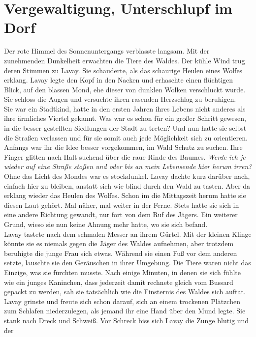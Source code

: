 \chapter{Vergewaltigung, Unterschlupf im Dorf}

Der rote Himmel des Sonnenuntergangs verblasste langsam. Mit der zunehmenden Dunkelheit erwachten 
die Tiere des Waldes. Der kühle Wind trug deren Stimmen zu Lavay. Sie schauderte, als das schaurige 
Heulen eines Wolfes erklang. Lavay legte den Kopf in den Nacken und erhaschte einen flüchtigen 
Blick, auf den blassen Mond, ehe dieser von dunklen Wolken verschluckt wurde. Sie schloss die Augen 
und versuchte ihren rasenden Herzschlag zu beruhigen.\\
Sie war ein Stadtkind, hatte in den ersten Jahren ihres Lebens nicht anderes als ihre ärmliches 
Viertel gekannt. Was war es schon für ein großer Schritt gewesen, in die besser gestellten 
Siedlungen der Stadt zu treten? Und nun hatte sie selbst die Straßen verlassen und für sie somit 
auch jede Möglichkeit sich zu orientieren. Anfangs war ihr die Idee besser vorgekommen, im Wald 
Schutz zu suchen. Ihre Finger glitten nach Halt suchend über die raue Rinde des Baumes. 
\textit{Werde ich je wieder auf eine Straße stoßen und oder bis an mein Lebensende hier herum 
irren?}\\
Ohne das Licht des Mondes war es stockdunkel. Lavay dachte kurz darüber nach, einfach hier zu 
bleiben, anstatt sich wie blind durch den Wald zu tasten. Aber da erklang wieder das Heulen des 
Wolfes. Schon im die Mittagszeit herum hatte sie diesen Laut gehört. Mal näher, mal weiter in der 
Ferne. Stets hatte sie sich in eine andere Richtung gewandt, nur fort von dem Ruf des Jägers. Ein 
weiterer Grund, wieso sie nun keine Ahnung mehr hatte, wo sie sich befand.\\ 
Lavay tastete nach dem schmalen Messer an ihrem Gürtel. Mit der kleinen Klinge könnte sie es niemals 
gegen die Jäger des Waldes aufnehmen, aber trotzdem beruhigte die junge Frau sich etwas. Während 
sie einen Fuß vor dem anderen setzte, lauschte sie den Geräuschen in ihrer Umgebung. Die Tiere 
waren nicht das Einzige, was sie fürchten musste. Nach einige Minuten, in denen sie sich fühlte wie 
ein junges Kaninchen, dass jederzeit damit rechnete gleich vom Bussard gepackt zu werden, sah sie 
tatsächlich wie die Finsternis des Waldes sich auftat. Lavay grinste und freute sich schon darauf, 
sich an einem trockenen Plätzchen zum Schlafen niederzulegen, als jemand ihr eine Hand über den Mund 
legte. Sie stank nach Dreck und Schweiß. Vor Schreck biss sich Lavay die Zunge blutig und der 

